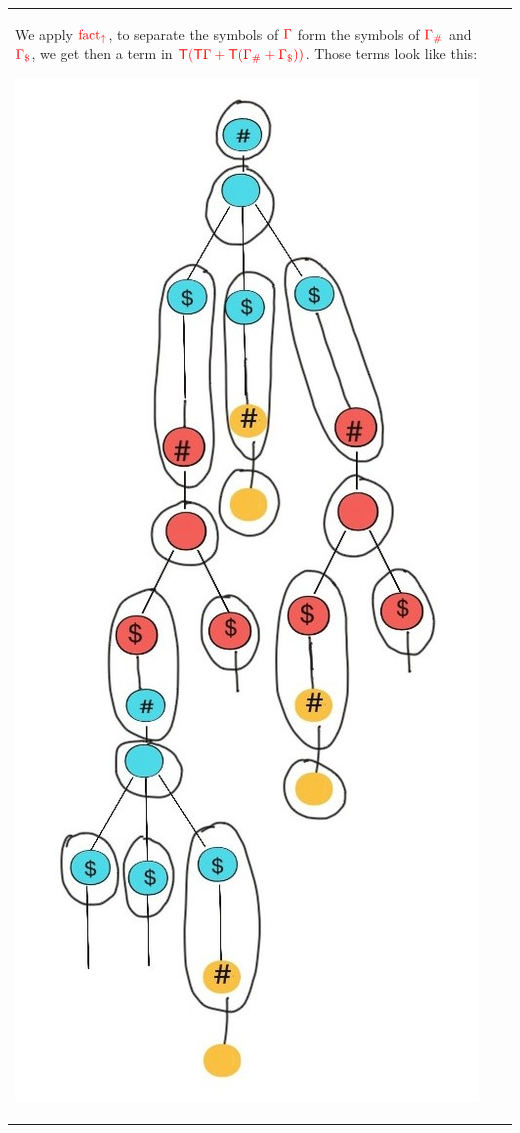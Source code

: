 \begin{example}
\begin{tabular}{l|l}
{\begin{center}
		\end{center}
	}
	\pictureline
	{We apply ${\color{red}{\mathrm{fact_{\uparrow}}}}$, to separate the symbols of ${\color{red}{\Gamma}}$ form the symbols of ${\color{red}{{\color{red}{\Gamma}}_\#}}$ and ${\color{red}{{\color{red}{\Gamma}}_\$}}$, we get then a term in ${\color{red}{{\color{red}{\mathsf T}}({\color{red}{\mathsf T}}{\color{red}{\Gamma}}+{\color{red}{\mathsf T}}({\color{red}{\Gamma}}_\#+{\color{red}{\Gamma}}_\$))}}$. Those terms look like this:
	}
	{
	\begin{center}
	\includegraphics[scale=.15]{MyPic3.jpg}

\end{center}}
\end{tabular}
\end{example}
